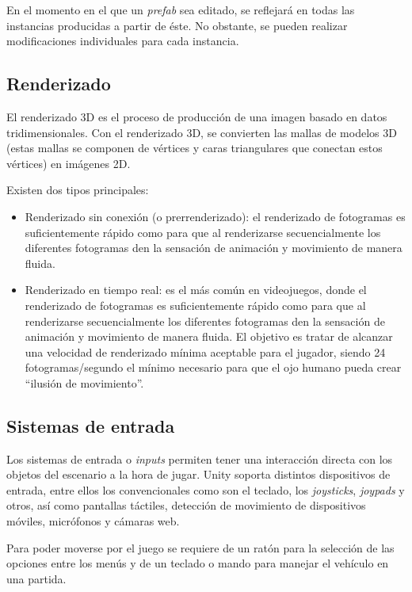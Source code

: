 En el momento en el que un \textit{prefab} sea editado, se reflejará en todas las instancias producidas a partir de éste. No obstante, se pueden realizar modificaciones individuales para cada instancia.

\subsection{Renderizado}

El renderizado 3D es el proceso de producción de una imagen basado en datos tridimensionales. Con el renderizado 3D, se convierten las mallas de modelos 3D (estas mallas se componen de vértices y caras triangulares que conectan estos vértices) en imágenes 2D. 

Existen dos tipos principales:
\begin{itemize}
\tightlist
	\item Renderizado sin conexión (o prerrenderizado): el renderizado de fotogramas es suficientemente rápido como para que al renderizarse secuencialmente los diferentes fotogramas den la sensación de animación y movimiento de manera fluida.
	\item Renderizado en tiempo real: es el más común en videojuegos, donde el renderizado de fotogramas es suficientemente rápido como para que al renderizarse secuencialmente los diferentes fotogramas den la sensación de animación y movimiento de manera fluida. El objetivo es tratar de alcanzar una velocidad de renderizado mínima aceptable para el jugador, siendo 24 fotogramas/segundo el mínimo necesario para que el ojo humano pueda crear ``ilusión de movimiento''.
\end{itemize}

\subsection{Sistemas de entrada}

Los sistemas de entrada o \textit{inputs} permiten tener una interacción directa con los objetos del escenario a la hora de jugar. Unity soporta distintos dispositivos de entrada, entre ellos los convencionales como son el teclado, los \textit{joysticks}, \textit{joypads} y otros, así como pantallas táctiles, detección de movimiento de dispositivos móviles, micrófonos y cámaras web.

Para poder moverse por el juego se requiere de un ratón para la selección de las opciones entre los menús y de un teclado o mando para manejar el vehículo en una partida.

